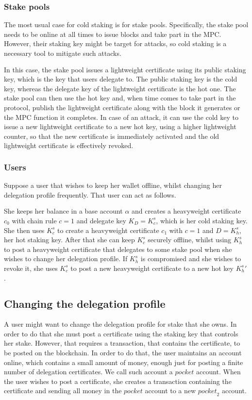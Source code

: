 \subsubsection{Stake pools}

The most usual case for cold staking is for stake pools. Specifically, the stake pool needs to be online at all times to issue blocks and take part in the MPC. However, their staking key might be target for attacks, so cold staking is a necessary tool to mitigate such attacks.

In this case, the stake pool issues a lightweight certificate using its public staking key, which is the key that users delegate to. The public staking key is the cold key, whereas the delegate key of the lightweight certificate is the hot one. The stake pool can then use the hot key and, when time comes to take part in the protocol, publish the lightweight certificate along with the block it generates or the MPC function it completes. In case of an attack, it can use the cold key to issue a new lightweight certificate to a new hot key, using a higher lightweight counter, so that the new certificate is immediately activated and the old lightweight certificate is effectively revoked.

\subsubsection{Users}

Suppose a user that wishes to keep her wallet offline, whilst changing her delegation profile frequently. That user can act as follows.

She keeps her balance in a base account $\alpha$ and creates a heavyweight certificate $c_0$ with chain rule $c = 1$ and delegate key $K_D = K^s_c$, which is her cold staking key. She then uses $K^s_c$ to create a heavyweight certificate $c_1$ with $c=1$ and $D = K^s_h$, her hot staking key. After that she can keep $K^s_c$ securely offline, whilst using $K^s_h$ to post a heavyweight certificate that delegates to some stake pool when she wishes to change her delegation profile. If $K^s_h$ is compromised and she wishes to revoke it, she uses $K^s_c$ to post a new heavyweight certificate to a new hot key ${K^s_h}'$.

\subsection{Changing the delegation profile}

A user might want to change the delegation profile for stake that she owns. In order to do that she must post a certificate using the staking key that controls her stake. However, that requires a transaction, that contains the certificate, to be posted on the blockchain. In order to do that, the user maintains an account online, which contains a small amount of money, enough just for posting a finite number of delegation certificates. We call such account a $pocket$ account. When the user wishes to post a certificate, she creates a transaction containing the certificate and sending all money in the $pocket$ account to a new ${pocket}_2$ account.

